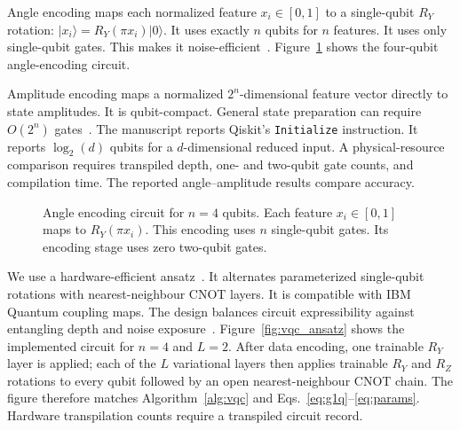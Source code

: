 \documentclass[final,5p,times,number]{elsarticle}
\begin{document}
Angle encoding maps each normalized feature $x_i \in [0,1]$ to a single-qubit $R_Y$ rotation: $|x_i\rangle = R_Y(\pi x_i)|0\rangle$. It uses exactly $n$ qubits for $n$ features. It uses only single-qubit gates. This makes it noise-efficient~\cite{schuld2019feature_hilbert,lloyd2020embeddings}. Figure~\ref{fig:encoding_circuit} shows the four-qubit angle-encoding circuit.

Amplitude encoding maps a normalized $2^n$-dimensional feature vector directly to state amplitudes. It is qubit-compact. General state preparation can require $O(2^n)$ gates~\cite{schuld2015introduction}. The manuscript reports Qiskit's \texttt{Initialize} instruction. It reports $\log_2(d)$ qubits for a $d$-dimensional reduced input. A physical-resource comparison requires transpiled depth, one- and two-qubit gate counts, and compilation time. The reported angle--amplitude results compare accuracy.

\begin{figure}[!htbp]
  \centering
  \caption{Angle encoding circuit for $n=4$ qubits. Each feature $x_i \in [0,1]$ maps to $R_Y(\pi x_i)$. This encoding uses $n$ single-qubit gates. Its encoding stage uses zero two-qubit gates.}
  \label{fig:encoding_circuit}
\end{figure}

We use a hardware-efficient ansatz~\cite{kandala2017hardware}. It alternates parameterized single-qubit rotations with nearest-neighbour CNOT layers. It is compatible with IBM Quantum coupling maps. The design balances circuit expressibility against entangling depth and noise exposure~\cite{sim2019expressibility}. Figure~\ref{fig:vqc_ansatz} shows the implemented circuit for $n=4$ and $L=2$. After data encoding, one trainable $R_Y$ layer is applied; each of the $L$ variational layers then applies trainable $R_Y$ and $R_Z$ rotations to every qubit followed by an open nearest-neighbour CNOT chain. The figure therefore matches Algorithm~\ref{alg:vqc} and Eqs.~\eqref{eq:g1q}--\eqref{eq:params}. Hardware transpilation counts require a transpiled circuit record.
\end{document}
